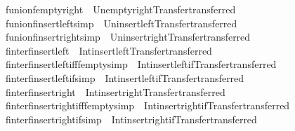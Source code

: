 \begin{isabellebody}
\isamarkupfalse%
\ funion{\isacharunderscore}fempty{\isacharunderscore}right\ {\isacharequal}\ Un{\isacharunderscore}empty{\isacharunderscore}right{\isacharbrackleft}Transfer{\isachardot}transferred{\isacharbrackright}\isanewline
{}\isamarkupfalse%
\ funion{\isacharunderscore}finsert{\isacharunderscore}left{\isacharbrackleft}simp{\isacharbrackright}\ {\isacharequal}\ Un{\isacharunderscore}insert{\isacharunderscore}left{\isacharbrackleft}Transfer{\isachardot}transferred{\isacharbrackright}\isanewline
{}\isamarkupfalse%
\ funion{\isacharunderscore}finsert{\isacharunderscore}right{\isacharbrackleft}simp{\isacharbrackright}\ {\isacharequal}\ Un{\isacharunderscore}insert{\isacharunderscore}right{\isacharbrackleft}Transfer{\isachardot}transferred{\isacharbrackright}\isanewline
{}\isamarkupfalse%
\ finter{\isacharunderscore}finsert{\isacharunderscore}left\ {\isacharequal}\ Int{\isacharunderscore}insert{\isacharunderscore}left{\isacharbrackleft}Transfer{\isachardot}transferred{\isacharbrackright}\isanewline
{}\isamarkupfalse%
\ finter{\isacharunderscore}finsert{\isacharunderscore}left{\isacharunderscore}ifffempty{\isacharbrackleft}simp{\isacharbrackright}\ {\isacharequal}\ Int{\isacharunderscore}insert{\isacharunderscore}left{\isacharunderscore}if{}{\isacharbrackleft}Transfer{\isachardot}transferred{\isacharbrackright}\isanewline
{}\isamarkupfalse%
\ finter{\isacharunderscore}finsert{\isacharunderscore}left{\isacharunderscore}if{}{\isacharbrackleft}simp{\isacharbrackright}\ {\isacharequal}\ Int{\isacharunderscore}insert{\isacharunderscore}left{\isacharunderscore}if{}{\isacharbrackleft}Transfer{\isachardot}transferred{\isacharbrackright}\isanewline
{}\isamarkupfalse%
\ finter{\isacharunderscore}finsert{\isacharunderscore}right\ {\isacharequal}\ Int{\isacharunderscore}insert{\isacharunderscore}right{\isacharbrackleft}Transfer{\isachardot}transferred{\isacharbrackright}\isanewline
{}\isamarkupfalse%
\ finter{\isacharunderscore}finsert{\isacharunderscore}right{\isacharunderscore}ifffempty{\isacharbrackleft}simp{\isacharbrackright}\ {\isacharequal}\ Int{\isacharunderscore}insert{\isacharunderscore}right{\isacharunderscore}if{}{\isacharbrackleft}Transfer{\isachardot}transferred{\isacharbrackright}\isanewline
{}\isamarkupfalse%
\ finter{\isacharunderscore}finsert{\isacharunderscore}right{\isacharunderscore}if{}{\isacharbrackleft}simp{\isacharbrackright}\ {\isacharequal}\ Int{\isacharunderscore}insert{\isacharunderscore}right{\isacharunderscore}if{}{\isacharbrackleft}Transfer{\isachardot}transferred{\isacharbrackright}\isanewline

\end{isabellebody}
